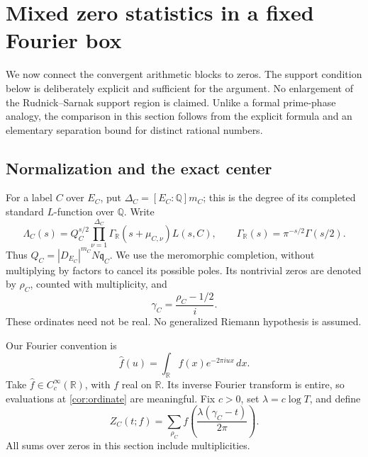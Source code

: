 \documentclass[11pt,reqno]{amsart}
\numberwithin{equation}{section}
\theoremstyle{definition}
\theoremstyle{remark}
\begin{document}
\section{Mixed zero statistics in a fixed Fourier box}\label{cor:section}
We now connect the convergent arithmetic blocks to zeros. The support condition below is deliberately explicit and sufficient for the argument. No enlargement of the Rudnick--Sarnak support region is claimed. Unlike a formal prime-phase analogy, the comparison in this section follows from the explicit formula and an elementary separation bound for distinct rational numbers.

\subsection{Normalization and the exact center}
For a label $C$ over $E_C$, put $\Delta_C=[E_C:\mathbb Q]m_C$; this is the degree of its completed standard $L$-function over $\mathbb Q$. Write
\begin{equation}\Lambda_C(s)=Q_C^{s/2}\prod_{\nu=1}^{\Delta_C}\Gamma_{\mathbb R}(s+\mu_{C,\nu})L(s,C),\qquad
\Gamma_{\mathbb R}(s)=\pi^{-s/2}\Gamma(s/2).\label{cor:completed}\end{equation}
Thus $Q_C=|D_{E_C}|^{m_C}N\mathfrak q_C$. We use the meromorphic completion, without multiplying by factors to cancel its possible poles. Its nontrivial zeros are denoted by $\rho_C$, counted with multiplicity, and
\begin{equation}\gamma_C=\frac{\rho_C-1/2}{i}.\label{cor:ordinate}\end{equation}
These ordinates need not be real. No generalized Riemann hypothesis is assumed.

Our Fourier convention is
\begin{equation}\widehat f(u)=\int_{\mathbb R}f(x)e^{-2\pi iux}\,dx.\label{cor:Fourier}\end{equation}
Take $\widehat f\in C_c^\infty(\mathbb R)$, with $f$ real on $\mathbb R$. Its inverse Fourier transform is entire, so evaluations at \eqref{cor:ordinate} are meaningful. Fix $c>0$, set $\lambda=c\log T$, and define
\begin{equation}Z_C(t;f)=\sum_{\rho_C}f\left(\frac{\lambda(\gamma_C-t)}{2\pi}\right).\label{cor:Z}\end{equation}
All sums over zeros in this section include multiplicities.
\end{document}
